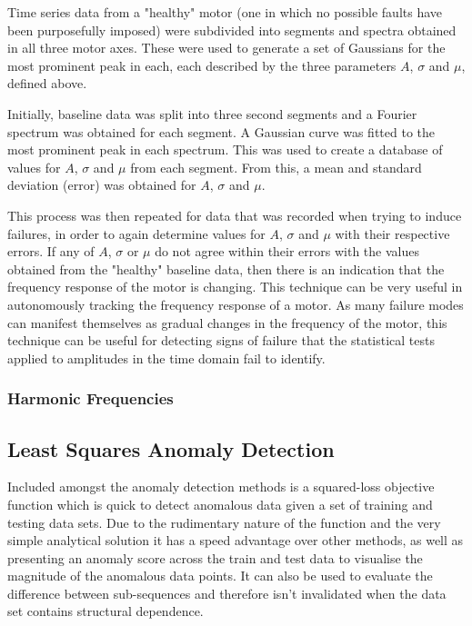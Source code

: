 Time series data from a "healthy" motor (one in which no possible faults have been purposefully imposed) were subdivided into segments and spectra obtained in all three motor axes. These were used to generate a set of Gaussians for the most prominent peak in each, each described by the three parameters $A$, $\sigma$ and $\mu$, defined above.

Initially, baseline data was split into three second segments and a Fourier spectrum was obtained for each segment. A Gaussian curve was fitted to the most prominent peak in each spectrum. This was used to create a database of values for $A$, $\sigma$ and $\mu$ from each segment. From this, a mean and standard deviation (error) was obtained for $A$, $\sigma$ and $\mu$. 

This process was then repeated for data that was recorded when trying to induce failures, in order to again determine values for $A$, $\sigma$ and $\mu$ with their respective errors. If any of $A$, $\sigma$ or $\mu$ do not agree within their errors with the values obtained from the "healthy" baseline data, then there is an indication that the frequency response of the motor is changing. This technique can be very useful in autonomously tracking the frequency response of a motor. As many failure modes can manifest themselves as gradual changes in the frequency of the motor, this technique can be useful for detecting signs of failure that the statistical tests applied to amplitudes in the time domain fail to identify. 
 
\subsubsection{Harmonic Frequencies}

\subsection{Least Squares Anomaly Detection}
Included amongst the anomaly detection methods is a squared-loss objective function which is quick to detect anomalous data given a set of training and testing data sets. Due to the rudimentary nature of the function and the very simple analytical solution it has a speed advantage over other methods, as well as presenting an anomaly score across the train and test data to visualise the magnitude of the anomalous data points. It can also be used to evaluate the difference between sub-sequences and therefore isn't invalidated when the data set contains structural dependence.

